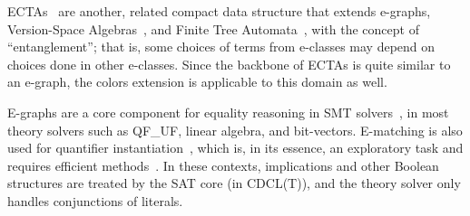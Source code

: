 ECTAs~\cite{Koppel22,Koppel23} are another, related compact data structure that extends e-graphs, Version-Space Algebras~\cite{DBLP:conf/icml/LauDW00,DBLP:journals/ml/LauWDW03}, and Finite Tree Automata~\cite{DBLP:journals/pacmpl/0001M17},
with the concept of ``entanglement'';
that is, some choices of terms from e-classes
may depend on choices done in other e-classes.
Since the backbone of ECTAs is quite similar to an e-graph, the colors extension is applicable to this domain as well.

E-graphs are a core component for equality reasoning in SMT solvers~\cite{z3,DBLP:conf/tacas/BarbosaBBKLMMMN22}, in most theory solvers such as QF\_UF, linear algebra, and bit-vectors.
E-matching is also used for quantifier instantiation~\cite{DBLP:conf/tacas/NiemetzPRBT21}, which is, in its essence, an exploratory task and requires efficient methods~\cite{DBLP:conf/cade/MouraB07}.
In these contexts, implications and other Boolean structures are treated by the SAT core (in CDCL(T)), and the theory solver only handles conjunctions of literals.
